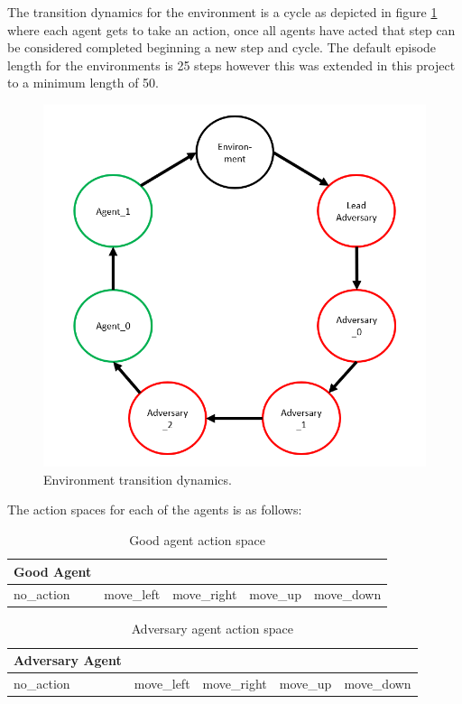\documentclass{article}
\begin{document}
\clearpage
The transition dynamics for the environment is a cycle as depicted in figure \ref{fig:stepcycle} where each agent gets to take an action, once all agents have acted that step can be considered completed beginning a new step and cycle.
The default episode length for the environments is 25 steps however this was extended in this project to a minimum length of 50.

\begin{figure}[!ht]
  \centering
  \includegraphics[scale=0.5]{Cycle_diagram.png}
  \caption{Environment transition dynamics.}
  \label{fig:stepcycle}
\end{figure}

The action spaces for each of the agents is as follows:

\begin{table}[!ht]
  \centering
  \begin{tabular}{|l|l|l|l|l|}
  \hline
  Good Agent &            &             &          &            \\ \hline
  no\_action & move\_left & move\_right & move\_up & move\_down \\ \hline
  \end{tabular}
  \caption{Good agent action space}
\end{table}

\begin{table}[!h]
  \centering
  \begin{tabular}{|l|l|l|l|l|}
  \hline
  Adversary Agent &            &             &          &            \\ \hline
  no\_action & move\_left & move\_right & move\_up & move\_down \\ \hline
  \end{tabular}
  \caption{Adversary agent action space}
\end{table}
\end{document}
